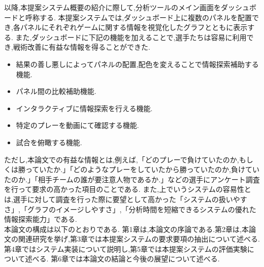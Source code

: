 \documentclass[sotsuron]{kuee}
\begin{document}
	以降,本提案システム概要の紹介に際して,分析ツールのメイン画面をダッシュボードと呼称する.
	本提案システムでは,ダッシュボード上に複数のパネルを配置でき,各パネルにそれぞれゲームに関する情報を視覚化したグラフとともに表示する.
	また,ダッシュボードに下記の機能を加えることで,選手たちは容易に利用でき,戦術改善に有益な情報を得ることができた.
		\begin{itemize}
			\item 結果の善し悪しによってパネルの配置,配色を変えることで情報探索補助する機能.
			\item パネル間の比較補助機能.
			\item インタラクティブに情報探索を行える機能.
			\item 特定のプレーを動画にて確認する機能.
			\item 試合を俯瞰する機能.
		\end{itemize}
	ただし,本論文での有益な情報とは,例えば,「どのプレーで負けていたのか,もしくは勝っていたか.」「どのようなプレーをしていたから勝っていたのか,負けていたのか.」「相手チームの誰が要注意人物であるか.」などの選手にアンケート調査を行って要求の高かった項目のことである.
	また,上でいうシステムの容易性とは,選手に対して調査を行った際に要望として高かった「システムの扱いやすさ」,「グラフのイメージしやすさ」,「分析時間を短縮できるシステムの優れた情報探索能力」である.
	\\本論文の構成は以下のとおりである.
	第1章は,本論文の序論である.第2章は,本論文の関連研究を挙げ,第3章では本提案システムの要求要項の抽出について述べる.
	第4章ではシステム実装について説明し,第5章では本提案システムの評価実験について述べる.
	第6章では本論文の結論と今後の展望について述べる.

\end{document}
